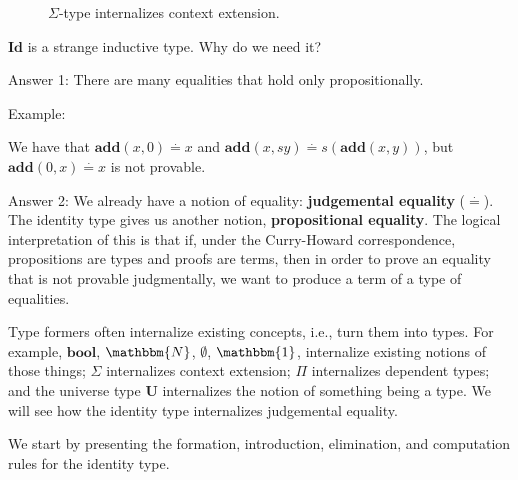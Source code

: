 \documentclass{amsart}
\theoremstyle{definition}
\newcommand{\N}{\mathbbm{N}}
\newcommand{\defeq}{\ensuremath{\overset{\cdot}{=}}}
\begin{document}
\begin{figure}[h]
    \centering
    
    \caption{$\Sigma$-type internalizes context extension.}
    \label{fig:internalize}
\end{figure}

$\mathbf{Id}$ is a strange inductive type. Why do we need it?

Answer 1: There are many equalities that hold only propositionally.

Example:

We have that $\mathbf{add} (x, 0) \defeq x$ and
$\mathbf{add} (x, s y) \defeq s (\mathbf{add}(x,y))$, but
$\mathbf{add}(0,x) \defeq x$ is not provable.

Answer 2: We already have a notion of equality: \textbf{judgemental equality} ($\defeq$). The identity type gives us another notion, \textbf{propositional equality}. The logical interpretation of this is that if, under the Curry-Howard correspondence, propositions are types and proofs are terms, then in order to prove an equality that is not provable judgmentally, we want to produce a term of a type of equalities.

Type formers often internalize existing concepts, i.e., turn them into types. For example, $\mathbf{bool}$, $\N$, $\emptyset$, $\mathbbm{1}$, internalize existing notions of those things; $\Sigma$ internalizes context extension; $\Pi$ internalizes dependent types; and the universe type $\mathbf{U}$ internalizes the notion of something being a type. We will see how the identity type internalizes judgemental equality.

We start by presenting the formation, introduction, elimination, and computation rules for the identity type.
\end{document}
